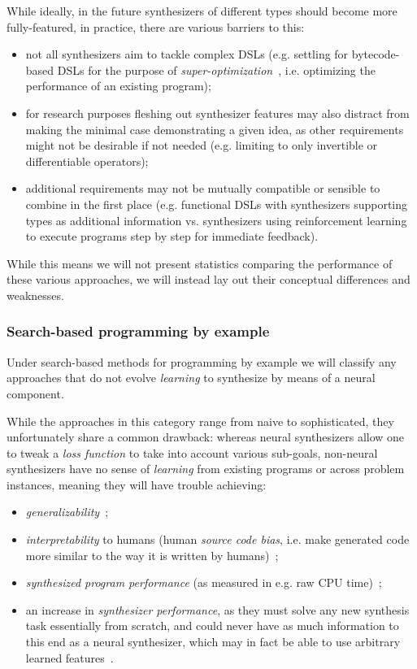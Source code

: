 \documentclass{article}
\begin{document}
{    While ideally, in the future synthesizers of different types should become more fully-featured,
    in practice, there are various barriers to this:
    \begin{itemize}
        \item not all synthesizers aim to tackle complex DSLs
        (e.g. settling for bytecode-based DSLs for the purpose of \emph{super-optimization}~\citep{schkufza2016stochastic}, i.e. optimizing the performance of an existing program);
        \item for research purposes fleshing out synthesizer features may also distract from making the minimal case demonstrating a given idea,
        as other requirements might not be desirable if not needed
        (e.g. limiting to only invertible or differentiable operators);
        \item additional requirements may not be mutually compatible or sensible to combine in the first place
        (e.g. functional DSLs with synthesizers supporting types as additional information vs. synthesizers using reinforcement learning to execute programs step by step for immediate feedback).
    \end{itemize}
}

While this means we will not present statistics
comparing the performance of these various approaches,
we will instead lay out their conceptual differences and weaknesses.

\subsubsection{Search-based programming by example}

Under search-based methods for programming by example we will classify any approaches that do not evolve \emph{learning} to synthesize by means of a neural component.

While the approaches in this category range from naive to sophisticated,
they unfortunately share a common drawback:
whereas neural synthesizers allow one to tweak a \emph{loss function} to take into account various sub-goals,
non-neural synthesizers have no sense of \emph{learning}
from existing programs or across problem instances,
meaning they will have trouble achieving:
\begin{itemize}
    \item \emph{generalizability}~\citep{nps};
    \item \emph{interpretability} to humans (human \emph{source code bias}, i.e. make generated code more similar to the way it is written by humans)~\citep{nps};
    \item \emph{synthesized program performance} (as measured in e.g. raw CPU time)~\citep{schkufza2016stochastic};
    \item an increase in \emph{synthesizer performance},
    as they must solve any new synthesis task essentially from scratch,
    and could never have as much information to this end as a neural synthesizer,
    which may in fact be able to use arbitrary learned features~\citep{odena2020learning}.
\end{itemize}
\end{document}
